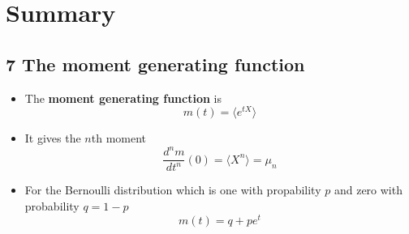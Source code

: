 
\ifind
\section*{Summary}
\else
\subsection*{7 The moment generating function}
\fi


\begin{itemize}
\item The \textbf{moment generating function} is
  \begin{equation}
    m(t)=\langle e^{tX}\rangle
  \end{equation}
\item It gives the $n$th moment
  \begin{equation}
\frac{d^nm}{dt^n}(0)=\langle X^n\rangle=\mu_n
\end{equation}
\item For the Bernoulli distribution which is one with propability $p$ and zero with probability $q=1-p$
  \begin{equation}
    m(t)=q+pe^t
  \end{equation}
  \end{itemize}

